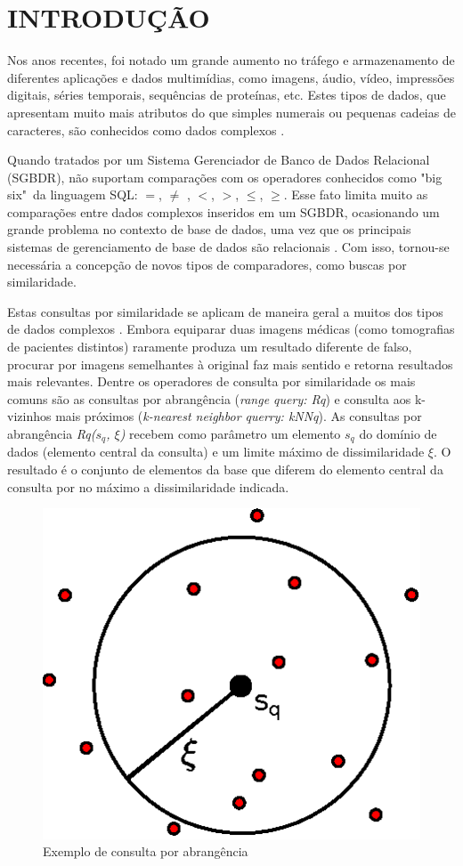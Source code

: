

\chapter{INTRODUÇÃO}
\label{chap:introducao}

Nos anos recentes, foi notado um grande aumento no tráfego e armazenamento de diferentes aplicações e dados multimídias, como imagens, áudio, vídeo, impressões digitais, séries temporais,
sequências de proteínas, etc. Estes tipos de dados, que apresentam muito mais atributos do que simples numerais ou pequenas cadeias de caracteres, são conhecidos como dados complexos \cite{Zighed2008}.\par
Quando tratados por um Sistema Gerenciador de Banco de Dados Relacional (SGBDR), não suportam comparações com os operadores conhecidos como "big six"\ da linguagem SQL: $=$, $\neq$ , $<$, $>$, $\leq$, $\geq$.
Esse fato limita muito as comparações entre dados complexos inseridos em um SGBDR, ocasionando um grande problema no contexto de base de dados, uma vez que os principais sistemas de gerenciamento
de base de dados são relacionais \cite{DBE2017}. Com isso, tornou-se necessária a concepção de novos tipos de comparadores, como buscas por similaridade.\par 

Estas consultas por similaridade se aplicam de maneira geral a muitos dos tipos de dados complexos \cite{Barioni2009}. Embora equiparar duas imagens médicas (como tomografias de pacientes distintos) 
raramente produza um resultado diferente de falso, procurar por imagens semelhantes à original faz mais sentido e retorna resultados mais relevantes. Dentre os operadores de consulta por similaridade
os mais comuns são as consultas por abrangência (\textit{range query: Rq}) e consulta aos k-vizinhos mais próximos (\textit{k-nearest neighbor querry: kNNq}). As consultas por abrangência \textit{Rq($s_q$, $\xi$)}
recebem como parâmetro um elemento $s_q$ do domínio de dados (elemento central da consulta) e um limite máximo de dissimilaridade $\xi$. O resultado é o conjunto de elementos da base que diferem do elemento
central da consulta por no máximo a dissimilaridade indicada.\par

\begin{figure}[ht]
\centering
\captionsetup{width=0.50\textwidth, font=footnotesize, textfont=bf}
\includegraphics[width=.3\textwidth]{dados/figuras/rq.eps}
\caption{Exemplo de consulta por abrangência}
\label{fig:exemplorq}
\end{figure}


